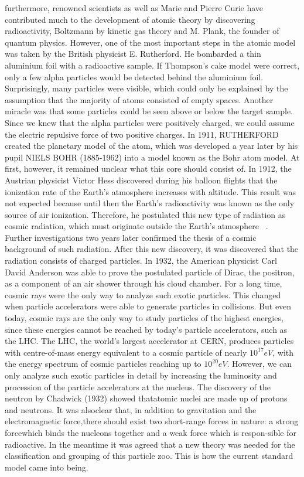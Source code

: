 furthermore, renowned scientists as well as Marie and Pierre Curie have contributed much to the development of atomic theory by discovering radioactivity, Boltzmann by kinetic gas theory and M. Plank, the founder of quantum physics.
However, one of the most important steps in the atomic model was taken by the British physicist E. Rutherford. He bombarded a thin aluminium foil with a radioactive sample. If Thompson's cake model were correct, only a few alpha particles would be detected behind the aluminium foil. Surprisingly, many particles were visible, which could only be explained by the assumption that the majority of atoms consisted of empty spaces. Another miracle was that some particles could be seen above or below the target sample. Since we knew that the alpha particles were positively charged, we could assume the electric repulsive force of two positive charges. In 1911, RUTHERFORD created the planetary model of the atom, which was developed a year later by his pupil NIELS BOHR (1885-1962) into a model known as the Bohr atom model.
At first, however, it remained unclear what this core should consist of.    
In 1912, the Austrian physicist Victor Hess discovered during his balloon flights that the ionization rate of the Earth's atmosphere increases with altitude. This result was not expected because until then the Earth's radioactivity was known as the only source of air ionization. Therefore, he postulated this new type of radiation as cosmic radiation, which must originate outside the Earth's atmosphere ~\cite{Ender}.\\
Further investigations two years later confirmed the thesis of a cosmic background of such radiation. After this new discovery, it was discovered that the radiation consists of charged particles. In 1932, the American physicist Carl David Anderson was able to prove the postulated particle of Dirac, the positron, as a component of an air shower through his cloud chamber. For a long time, cosmic rays were the only way to analyze such exotic particles.
This changed when particle accelerators were able to generate particles in collisions. But even today, cosmic rays are the only way to study particles of the highest energies, since these energies cannot be reached by today's particle accelerators, such as the LHC. The LHC, the world's largest accelerator at CERN, produces particles with centre-of-mass energy equivalent to a cosmic particle of nearly $10^{17} eV $, with the energy spectrum of cosmic particles reaching up to $10^{20} eV $.
However, we can only analyze such exotic particles in detail by increasing the luminosity and procession of the particle accelerators at the nucleus. 
The discovery of the neutron by Chadwick (1932) showed thatatomic nuclei are made up of protons and neutrons. It was alsoclear that, in addition to gravitation and the electromagnetic force,there should exist two short-range forces in nature: a strong forcewhich binds the nucleons together and a weak force which is respon-sible for radioactive.
In the meantime it was agreed that a new theory was needed for the classification and grouping of this particle zoo. This is how the current standard model came into being.

